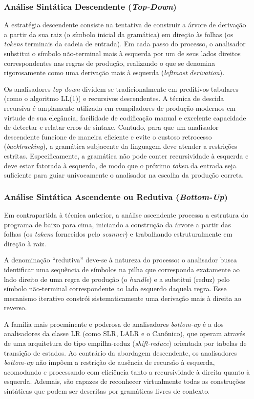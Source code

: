 \subsubsection*{Análise Sintática Descendente (\textit{Top-Down})}
A estratégia descendente consiste na tentativa de construir a árvore de derivação a partir da sua raiz (o símbolo inicial da gramática) em direção às folhas (os \textit{tokens} terminais da cadeia de entrada). Em cada passo do processo, o analisador substitui o símbolo não-terminal mais à esquerda por um de seus lados direitos correspondentes nas regras de produção, realizando o que se denomina rigorosamente como uma derivação mais à esquerda (\textit{leftmost derivation}).

Os analisadores \textit{top-down} dividem-se tradicionalmente em preditivos tabulares (como o algoritmo LL(1)) e recursivos descendentes. A técnica de descida recursiva é amplamente utilizada em compiladores de produção modernos em virtude de sua elegância, facilidade de codificação manual e excelente capacidade de detectar e relatar erros de sintaxe. Contudo, para que um analisador descendente funcione de maneira eficiente e evite o custoso retrocesso (\textit{backtracking}), a gramática subjacente da linguagem deve atender a restrições estritas. Especificamente, a gramática não pode conter recursividade à esquerda e deve estar fatorada à esquerda, de modo que o próximo \textit{token} da entrada seja suficiente para guiar univocamente o analisador na escolha da produção correta.

\subsubsection*{Análise Sintática Ascendente ou Redutiva (\textit{Bottom-Up})}
Em contrapartida à técnica anterior, a análise ascendente processa a estrutura do programa de baixo para cima, iniciando a construção da árvore a partir das folhas (os \textit{tokens} fornecidos pelo \textit{scanner}) e trabalhando estruturalmente em direção à raiz. 

A denominação ``redutiva'' deve-se à natureza do processo: o analisador busca identificar uma sequência de símbolos na pilha que corresponda exatamente ao lado direito de uma regra de produção (o \textit{handle}) e a substitui (reduz) pelo símbolo não-terminal correspondente ao lado esquerdo daquela regra. Esse mecanismo iterativo constrói sistematicamente uma derivação mais à direita ao reverso.

A família mais proeminente e poderosa de analisadores \textit{bottom-up} é a dos analisadores da classe LR (como SLR, LALR e o Canônico), que operam através de uma arquitetura do tipo empilha-reduz (\textit{shift-reduce}) orientada por tabelas de transição de estados. Ao contrário da abordagem descendente, os analisadores \textit{bottom-up} não impõem a restrição de ausência de recursão à esquerda, acomodando e processando com eficiência tanto a recursividade à direita quanto à esquerda. Ademais, são capazes de reconhecer virtualmente todas as construções sintáticas que podem ser descritas por gramáticas livres de contexto. 

